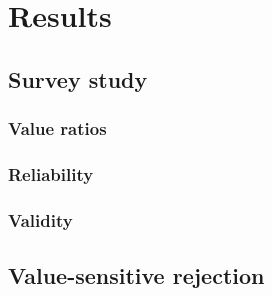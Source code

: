 \chapter{Results}

\section{Survey study}
\label{sec:results-survey-study}

\subsection{Value ratios}

\subsection{Reliability}

\subsection{Validity}

\section{Value-sensitive rejection}

